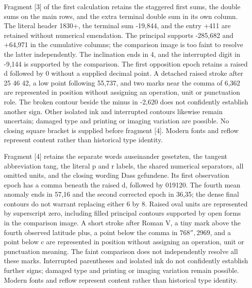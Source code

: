 Fragment [3] of the first calculation retains the staggered first sums, the double sums on the main rows, and the extra terminal double sum in its own column. The literal header 1830+, the terminal sum -19,844, and the entry +411 are retained without numerical emendation. The principal supports -285,682 and +64,971 in the cumulative columns; the comparison image is too faint to resolve the latter independently. The inclination ends in 4, and the interrupted digit in -9,144 is supported by the comparison. The first opposition epoch retains a raised d followed by 0 without a supplied decimal point. A detached raised stroke after 25 46 42, a low point following 55,737, and two marks near the comma of 6,362 are represented in position without assigning an operation, unit or punctuation role. The broken contour beside the minus in -2,620 does not confidently establish another sign. Other isolated ink and interrupted contours likewise remain uncertain; damaged type and printing or imaging variation are possible. No closing square bracket is supplied before fragment [4]. Modern fonts and reflow represent content rather than historical type identity.

Fragment [4] retains the separate words auseinander gesetzten, the tangent abbreviation tang, the literal p and r labels, the shared numerical separators, all omitted units, and the closing wording Dass gefundene. Its first observation epoch has a comma beneath the raised d, followed by 019120. The fourth mean anomaly ends in 57,16 and the second corrected epoch in 36,35; the dense final contours do not warrant replacing either 6 by 8. Raised oval units are represented by superscript zero, including filled principal contours supported by open forms in the comparison image. A short stroke after Roman V, a tiny mark above the fourth observed latitude plus, a point below the comma in \(768'',2969\), and a point below c are represented in position without assigning an operation, unit or punctuation meaning. The faint comparison does not independently resolve all these marks. Interrupted parentheses and isolated ink do not confidently establish further signs; damaged type and printing or imaging variation remain possible. Modern fonts and reflow represent content rather than historical type identity.


